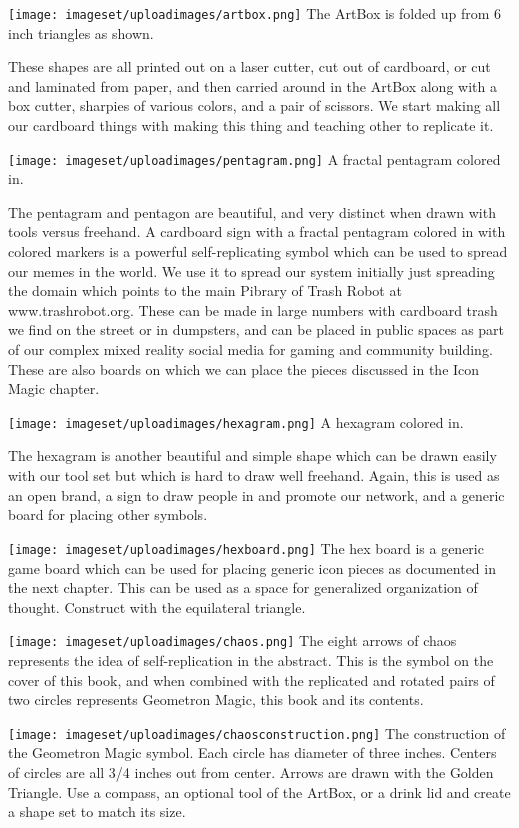 \texttt{[image: imageset/uploadimages/artbox.png]} The ArtBox is folded
up from 6 inch triangles as shown.

These shapes are all printed out on a laser cutter, cut out of
cardboard, or cut and laminated from paper, and then carried around in
the ArtBox along with a box cutter, sharpies of various colors, and a
pair of scissors. We start making all our cardboard things with making
this thing and teaching other to replicate it.

\texttt{[image: imageset/uploadimages/pentagram.png]} A fractal
pentagram colored in.

The pentagram and pentagon are beautiful, and very distinct when drawn
with tools versus freehand. A cardboard sign with a fractal pentagram
colored in with colored markers is a powerful self-replicating symbol
which can be used to spread our memes in the world. We use it to spread
our system initially just spreading the domain which points to the main
Pibrary of Trash Robot at www.trashrobot.org. These can be made in large
numbers with cardboard trash we find on the street or in dumpsters, and
can be placed in public spaces as part of our complex mixed reality
social media for gaming and community building. These are also boards on
which we can place the pieces discussed in the Icon Magic chapter.

\texttt{[image: imageset/uploadimages/hexagram.png]} A hexagram colored
in.

The hexagram is another beautiful and simple shape which can be drawn
easily with our tool set but which is hard to draw well freehand. Again,
this is used as an open brand, a sign to draw people in and promote our
network, and a generic board for placing other symbols.

\texttt{[image: imageset/uploadimages/hexboard.png]} The hex board is a
generic game board which can be used for placing generic icon pieces as
documented in the next chapter. This can be used as a space for
generalized organization of thought. Construct with the equilateral
triangle.

\texttt{[image: imageset/uploadimages/chaos.png]} The eight arrows of
chaos represents the idea of self-replication in the abstract. This is
the symbol on the cover of this book, and when combined with the
replicated and rotated pairs of two circles represents Geometron Magic,
this book and its contents.

\texttt{[image: imageset/uploadimages/chaosconstruction.png]} The
construction of the Geometron Magic symbol. Each circle has diameter of
three inches. Centers of circles are all 3/4 inches out from center.
Arrows are drawn with the Golden Triangle. Use a compass, an optional
tool of the ArtBox, or a drink lid and create a shape set to match its
size.

